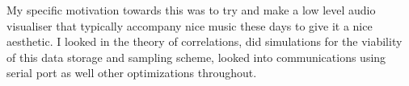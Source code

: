 My specific motivation towards this was to try and make a low level audio visualiser that typically accompany nice music these days to give it a nice aesthetic. I looked in the theory of correlations, did simulations for the viability of this data storage and sampling scheme, looked into communications using serial port as well other optimizations throughout. 